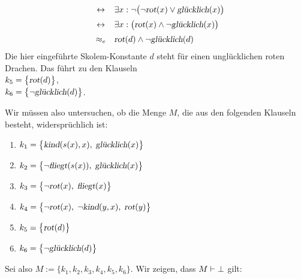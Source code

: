 \begin{enumerate}
$$\begin{array}{lcl}
         & \leftrightarrow & \exists x: \neg \bigl(\neg \textsl{rot}(x) \vee \textsl{gl\"{u}cklich}(x) \bigr)
         \\[0.2cm]
         & \leftrightarrow & \exists x: \bigl(\textsl{rot}(x) \wedge \neg \textsl{gl\"{u}cklich}(x) \bigr)
         \\[0.2cm]
         & \approx_e & \textsl{rot}(d) \wedge \neg \textsl{gl\"{u}cklich}(d) \\
        \end{array}
      $$
      Die hier eingef\"{u}hrte Skolem-Konstante $d$ steht f\"{u}r einen ungl\"{u}cklichen roten Drachen.
      Das f\"{u}hrt zu den Klauseln \\[0.2cm]
      \hspace*{1.3cm} $k_5 = \bigl\{ \textsl{rot}(d) \bigl\}$, \\[0.2cm]
      \hspace*{1.3cm} $k_6 = \bigl\{ \neg \textsl{gl\"{u}cklich}(d) \bigl\}$.
\end{enumerate}
Wir m\"{u}ssen also untersuchen, ob die Menge $M$, die aus den folgenden Klauseln besteht,
widerspr\"{u}chlich ist: 
\begin{enumerate}
\item $k_1 = \bigl\{ \textsl{kind}(s(x),x),\; \textsl{gl\"{u}cklich}(x) \bigl\}$  
\item $k_2 = \bigl\{ \neg \textsl{fliegt}(s(x)),\; \textsl{gl\"{u}cklich}(x) \bigl\}$
\item $k_3 = \bigl\{ \neg \textsl{rot}(x),\; \textsl{fliegt}(x) \bigl\}$
\item $k_4 = \bigl\{ \neg \textsl{rot}(x),\; \neg \textsl{kind}(y,x),\; \textsl{rot}(y) \bigl\}$
\item $k_5 = \bigl\{ \textsl{rot}(d) \bigl\}$ 
\item $k_6 = \bigl\{ \neg \textsl{gl\"{u}cklich}(d) \bigl\}$
\end{enumerate}
Sei also $M := \bigl\{k_1,k_2,k_3,k_4,k_5,k_6\bigl\}$.
Wir  zeigen, dass $M \vdash \bot$ gilt:
